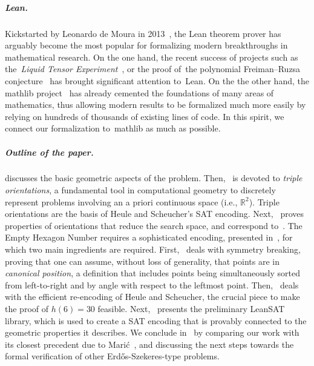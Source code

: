 \subparagraph*{Lean.} Kickstarted by Leonardo de Moura in 2013~\cite{demouraLeanTheoremProver2015}, the Lean theorem prover has arguably become the most popular for formalizing modern breakthroughs in mathematical research. 
On the one hand, the recent success of projects such as the~\emph{Liquid Tensor Experiment}~\cite{Castelvecchi2021}, or the proof of~the polynomial Freiman–Ruzsa conjecture~\cite{gowers2023conjecture, slomanATeamMathProves2023} has brought significant attention to~Lean. %
On the the other hand, the \textsf{mathlib} project~\cite{The_mathlib_Community_2020} has already cemented the foundations of many areas of mathematics, thus allowing modern results to be formalized much more easily by relying on hundreds of thousands of existing lines of code. In this spirit, we connect our formalization to~\textsf{mathlib} as much as possible.

\subparagraph*{Outline of the paper.} 
 discusses the basic geometric aspects of the problem.  Then,~ is devoted to \emph{triple orientations}, a fundamental tool in computational geometry to discretely represent problems involving an a priori continuous space (i.e., $\mathbb{R}^2$).
 Triple orientations are the basis of Heule and Scheucher's SAT encoding. 
 Next,~ proves properties of orientations that reduce the search space,
and correspond to~.
The Empty Hexagon Number requires a sophisticated encoding, presented in~, for which two main ingredients are required. First,~ deals with symmetry breaking, proving that one can assume, without loss of generality, that points are in \emph{canonical position}, a definition that includes points being simultaneously sorted from left-to-right and by angle with respect to the leftmost point. 
Then,~ deals with the efficient re-encoding of Heule and Scheucher, the crucial piece to make the proof of $h(6) = 30$ feasible. Next,~ presents the preliminary \textsf{LeanSAT} library, which is used to create a SAT encoding that is provably connected to the geometric properties it describes. We conclude in~ by comparing our work with its closest precedent due to Marić~\cite{19maric_fast_formal_proof_erdos_szekeres_conjecture_convex_polygons_most_six_points}, and discussing the next steps towards the formal verification of other Erd\H{o}s-Szekeres-type problems.

